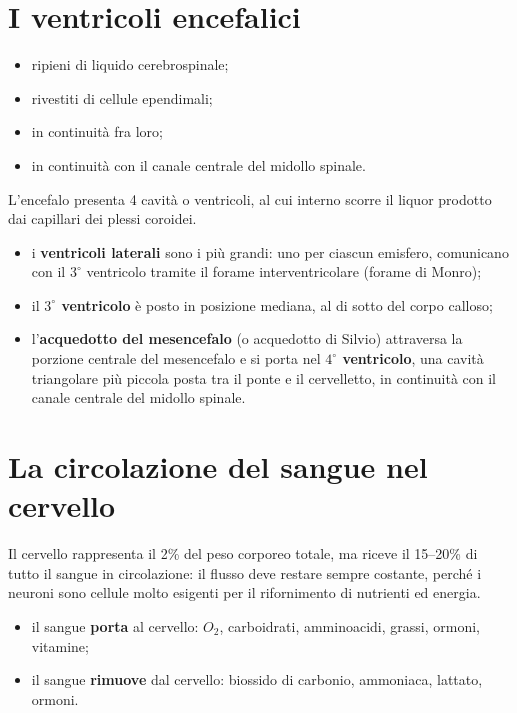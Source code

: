 \section{I ventricoli encefalici}

\begin{itemize}
  \item ripieni di liquido cerebrospinale;
  \item rivestiti di cellule ependimali;
  \item in continuità fra loro;
  \item in continuità con il canale centrale del midollo spinale.
\end{itemize}

L'encefalo presenta 4 cavità o ventricoli, al cui interno scorre il liquor
prodotto dai capillari dei plessi coroidei.
\begin{itemize}
  \item i \textbf{ventricoli laterali} sono i più grandi: uno per ciascun
    emisfero, comunicano con il $3^\circ$ ventricolo tramite il forame
    interventricolare (forame di Monro);
  \item il \textbf{$3^\circ$ ventricolo} è posto in posizione mediana, al di
    sotto del corpo calloso;
  \item l'\textbf{acquedotto del mesencefalo} (o acquedotto di Silvio)
    attraversa la porzione centrale del mesencefalo e si porta nel
    \textbf{$4^\circ$ ventricolo}, una cavità triangolare più piccola posta
    tra il ponte e il cervelletto, in continuità con il canale centrale del
    midollo spinale.
\end{itemize}

\section{La circolazione del sangue nel cervello}

Il cervello rappresenta il 2\% del peso corporeo totale, ma riceve il 15--20\% di
tutto il sangue in circolazione: il flusso deve restare sempre costante, perché i
neuroni sono cellule molto esigenti per il rifornimento di nutrienti ed energia.

\begin{itemize}
  \item il sangue \textbf{porta} al cervello: $O_2$, carboidrati, amminoacidi,
    grassi, ormoni, vitamine;
  \item il sangue \textbf{rimuove} dal cervello: biossido di carbonio, ammoniaca,
    lattato, ormoni.
\end{itemize}

